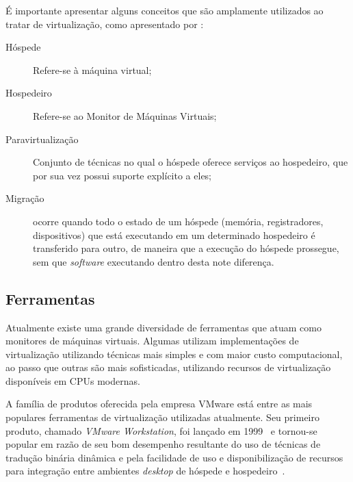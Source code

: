 

É importante apresentar alguns conceitos que são amplamente utilizados ao
tratar de virtualização, como apresentado por
:
\begin{description}
  \item[Hóspede] Refere-se à máquina virtual;
  \item[Hospedeiro] Refere-se ao Monitor de Máquinas Virtuais;
  \item[Paravirtualização] Conjunto de técnicas no qual o hóspede oferece
        serviços ao hospedeiro, que por sua vez possui suporte explícito a
        eles;
  \item[Migração] ocorre quando todo o estado de um hóspede
       (memória, registradores, dispositivos) que está executando em um
       determinado hospedeiro é transferido para outro, de maneira que a
       execução do hóspede prossegue, sem que \emph{software} executando dentro
       desta note diferença.
\end{description}

\subsection{Ferramentas}

Atualmente existe uma grande diversidade de ferramentas que atuam como
monitores de máquinas virtuais. Algumas utilizam implementações de
virtualização utilizando técnicas mais simples e com maior custo
computacional, ao passo que outras são mais sofisticadas, utilizando
recursos de virtualização disponíveis em CPUs modernas.


A família de produtos oferecida pela empresa VMware está entre as mais
populares ferramentas de virtualização utilizadas atualmente. Seu primeiro
produto, chamado \emph{VMware Workstation}, foi lançado em
1999~\cite{vmwareMilestones} e tornou-se popular em razão de seu bom
desempenho resultante do uso de técnicas de tradução binária dinâmica e
pela facilidade de uso e disponibilização de recursos para integração entre
ambientes \emph{desktop} de hóspede e hospedeiro~\cite{nieh2000examining}.

